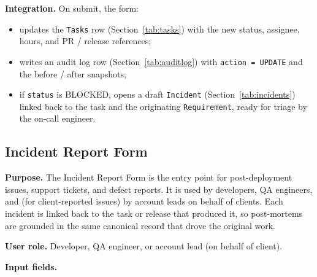 \documentclass[12pt,a4paper]{report}
\begin{document}
\textbf{Integration.} On submit, the form:
\begin{itemize}[leftmargin=1.6em]
    \item updates the \texttt{Tasks} row (Section~\ref{tab:tasks}) with the
          new status, assignee, hours, and PR / release references;
    \item writes an audit log row (Section~\ref{tab:auditlog}) with
          \texttt{action = UPDATE} and the before / after snapshots;
    \item if \texttt{status} is BLOCKED, opens a draft \texttt{Incident}
          (Section~\ref{tab:incidents}) linked back to the task and the
          originating \texttt{Requirement}, ready for triage by the
          on-call engineer.
\end{itemize}

\subsection{Incident Report Form}
\label{sec:form-incident}

\textbf{Purpose.} The Incident Report Form is the entry point for
post-deployment issues, support tickets, and defect reports. It is used by
developers, QA engineers, and (for client-reported issues) by account leads
on behalf of clients. Each incident is linked back to the task or release
that produced it, so post-mortems are grounded in the same canonical record
that drove the original work.

\textbf{User role.} Developer, QA engineer, or account lead (on behalf of
client).

\textbf{Input fields.}
\end{document}

